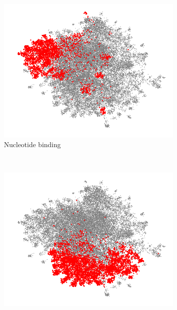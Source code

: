 \begin{figure}[t!]
    \centering
    \begin{subfigure}[t]{0.3\textwidth}
    \vskip 0pt
        \includegraphics[width=\textwidth]{Figures/nucleotidebinding}
        \caption{Nucleotide binding}
        \label{fig:gull}
    \end{subfigure}
    ~ %
    \begin{subfigure}[t]{0.3\textwidth}
    \vskip 0pt
        \includegraphics[width=\textwidth]{Figures/ribosome}

\end{subfigure}
\end{figure}
